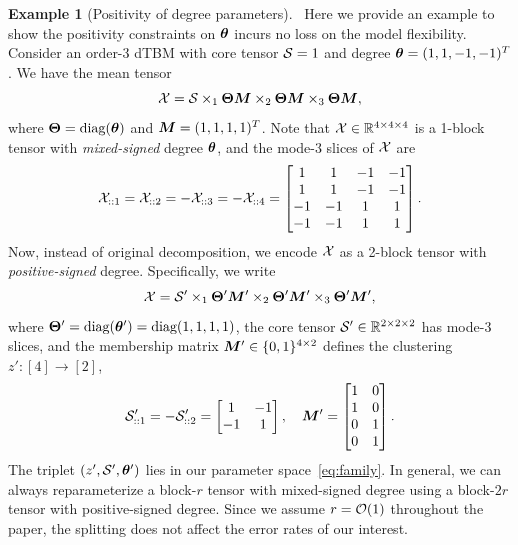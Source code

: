 \documentclass[journal]{IEEEtran}
\theoremstyle{definition}
\theoremstyle{definition}
\newtheorem{example}{Example}
\begin{document}
\begin{example}[Positivity of degree parameters]~\label{ex:positive}
Here we provide an example to show the positivity constraints on $\boldsymbol{\theta}$ incurs no loss on the model flexibility. 
Consider an order-3 dTBM with core tensor $\mathcal{S} = 1$ and degree $\boldsymbol{\theta} = (1,1,-1, -1)^T$. We have the mean tensor 
\begin{equation}
    \mathcal{X} = \mathcal{S} \times_1 \boldsymbol{\Theta} \bm M \times_2 \boldsymbol{\Theta} \bm M \times_3 \boldsymbol{\Theta} \bm M,
\end{equation}
where $\boldsymbol{\Theta} = \text{diag}(\boldsymbol{\theta})$ and $\bm M = (1,1,1,1)^T$. Note that $\mathcal{X} \in \mathbb{R}^{4 \times 4 \times 4}$ is a 1-block tensor with \emph{mixed-signed} degree $\boldsymbol{\theta}$, and the mode-3 slices of $\mathcal{X}$ are
\begin{equation}
    \mathcal{X}_{::1} = \mathcal{X}_{::2} = - \mathcal{X}_{::3} = -\mathcal{X}_{::4}  = \begin{bmatrix}
    1 & 1& -1& -1 \\
    1 & 1& -1& -1 \\
    -1& -1&1 & 1\\
     -1& -1&1 & 1
    \end{bmatrix}.
\end{equation}
Now, instead of original decomposition, we encode $\mathcal{X}$ as a 2-block tensor with \emph{positive-signed} degree. Specifically, we write
\begin{equation}
     \mathcal{X} = \mathcal{S}' \times_1 \boldsymbol{\Theta}' \bm M' \times_2 \boldsymbol{\Theta}' \bm M'  \times_3 \boldsymbol{\Theta}' \bm M' , 
\end{equation}
where $\boldsymbol{\Theta}' = \text{diag}(\boldsymbol{\theta}') = \text{diag}(1,1, 1, 1)$, the core tensor $\mathcal{S}' \in \mathbb{R}^{2 \times 2 \times 2}$ has mode-3 slices, and the membership matrix $\bm M'\in\{0,1\}^{4\times 2}$ defines the clustering $z'\colon[4]\to[2]$,
\begin{equation}
    \mathcal{S}'_{::1} = -\mathcal{S}'_{::2} = \begin{bmatrix}
    1 & -1 \\
    -1 & 1
    \end{bmatrix}, \quad \bm M' = \begin{bmatrix}
   1 & 0 \\
   1 &0 \\
    0 & 1 \\
    0&1
    \end{bmatrix}.
\end{equation}
 The triplet $(z',\mathcal{S}', \boldsymbol{\theta}')$ lies in our parameter space~\eqref{eq:family}. In general, we can always reparameterize a block-$r$ tensor with mixed-signed degree using a block-$2r$ tensor with positive-signed degree. Since we assume $r=\mathcal{O}(1)$ throughout the paper, the splitting does not affect the error rates of our interest.
 \end{example}
\end{document}
